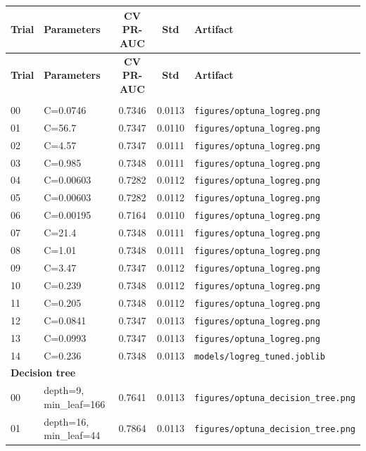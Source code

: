 \documentclass[11pt,a4paper]{article}
\begin{document}
{\scriptsize
\setlength{\tabcolsep}{3pt}\begin{longtable}{lp{6.9cm}ccl}
\toprule
\textbf{Trial} & \textbf{Parameters} & \textbf{CV PR-AUC} & \textbf{Std} & \textbf{Artifact} \\
\endfirsthead
\toprule
\textbf{Trial} & \textbf{Parameters} & \textbf{CV PR-AUC} & \textbf{Std} & \textbf{Artifact} \\
\midrule
\endhead
\bottomrule
\endfoot
\midrule
\multicolumn{5}{l}{\textbf{Logistic regression}}\\
00 & C=0.0746 & 0.7346 & 0.0113 & \texttt{figures/optuna\_logreg.png}\\
01 & C=56.7 & 0.7347 & 0.0110 & \texttt{figures/optuna\_logreg.png}\\
02 & C=4.57 & 0.7347 & 0.0111 & \texttt{figures/optuna\_logreg.png}\\
03 & C=0.985 & 0.7348 & 0.0111 & \texttt{figures/optuna\_logreg.png}\\
04 & C=0.00603 & 0.7282 & 0.0112 & \texttt{figures/optuna\_logreg.png}\\
05 & C=0.00603 & 0.7282 & 0.0112 & \texttt{figures/optuna\_logreg.png}\\
06 & C=0.00195 & 0.7164 & 0.0110 & \texttt{figures/optuna\_logreg.png}\\
07 & C=21.4 & 0.7348 & 0.0111 & \texttt{figures/optuna\_logreg.png}\\
08 & C=1.01 & 0.7348 & 0.0111 & \texttt{figures/optuna\_logreg.png}\\
09 & C=3.47 & 0.7347 & 0.0112 & \texttt{figures/optuna\_logreg.png}\\
10 & C=0.239 & 0.7348 & 0.0112 & \texttt{figures/optuna\_logreg.png}\\
11 & C=0.205 & 0.7348 & 0.0112 & \texttt{figures/optuna\_logreg.png}\\
12 & C=0.0841 & 0.7347 & 0.0113 & \texttt{figures/optuna\_logreg.png}\\
13 & C=0.0993 & 0.7347 & 0.0113 & \texttt{figures/optuna\_logreg.png}\\
\rowcolor{gray!15} 14 & C=0.236 & 0.7348 & 0.0113 & \texttt{models/logreg\_tuned.joblib}\\
\midrule
\multicolumn{5}{l}{\textbf{Decision tree}}\\
00 & depth=9, min\_leaf=166 & 0.7641 & 0.0113 & \texttt{figures/optuna\_decision\_tree.png}\\
01 & depth=16, min\_leaf=44 & 0.7864 & 0.0113 & \texttt{figures/optuna\_decision\_tree.png}\\

\end{longtable}}
\end{document}

